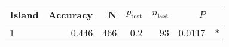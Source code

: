
\begin{tabular}{lrrrrrl}
\toprule
Island & Accuracy & N & $p_{\mbox{test}}$ & $n_{\mbox{test}}$ & $P$ & \\
\midrule
1 & 0.446 & 466 & 0.2 & 93 & 0.0117 & *\\
\bottomrule
\end{tabular}
